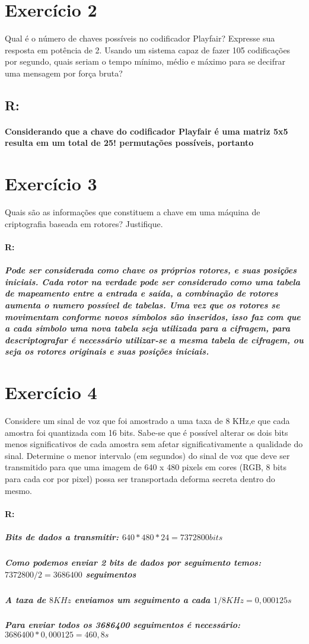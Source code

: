 \documentclass[10pt,a4paper]{article}
\begin{document}
\section*{Exercício 2}
Qual é o número de chaves possíveis no codificador Playfair? Expresse sua resposta em potência de 2. Usando um sistema capaz de fazer 105 codificações por segundo, quais seriam o tempo mínimo, médio e máximo para se decifrar uma mensagem por força bruta?
\subsection*{R:}
\paragraph*{ Considerando que a chave do codificador  Playfair é uma matriz 5x5 resulta em um total de 25! permutações possíveis, portanto }
\section*{Exercício 3}
Quais são as informações que constituem a chave em uma máquina de criptografia baseada em rotores? Justifique.
\paragraph*{R:}
\subparagraph*{ Pode ser considerada como chave os próprios rotores, e suas posições iniciais. Cada rotor na verdade pode ser considerado como uma tabela de mapeamento entre a entrada e saída, a combinação de rotores aumenta o numero possível de tabelas. Uma vez que os rotores se movimentam conforme novos símbolos são inseridos, isso faz com que a cada simbolo uma nova tabela seja utilizada para a cifragem, para descriptografar é necessário utilizar-se a mesma tabela de cifragem, ou seja os rotores originais e suas posições iniciais.}
\section*{Exercício 4}
Considere um sinal de voz que foi amostrado a uma taxa de 8 KHz,e que cada amostra foi quantizada com 16 bits. Sabe-se que é possível alterar os dois bits menos significativos de cada amostra sem afetar significativamente a qualidade do sinal. Determine o menor intervalo (em segundos) do sinal de voz que deve ser transmitido para que uma imagem de 640 x 480 pixels em cores (RGB, 8 bits para cada cor por pixel) possa ser transportada deforma secreta dentro do mesmo.
\paragraph*{R:}
\subparagraph*{Bits de dados a transmitir: $640*480*24 = 7372800bits$}
\subparagraph*{Como podemos enviar 2 bits de dados por seguimento temos: $7372800/2 = 3686400$ seguimentos}
\subparagraph*{A taxa de $8KHz$ enviamos um seguimento a cada $1/8KHz = 0,000125s$}
\subparagraph*{Para enviar todos os 3686400 seguimentos é necessário: $3686400*0,000125 = 460,8s $ }
\end{document}
